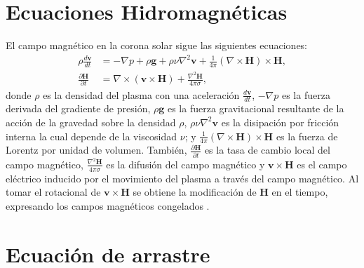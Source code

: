 \chapter{Ecuaciones Hidromagnéticas}
\label{ecuHM}

El campo magnético en la corona solar sigue las siguientes ecuaciones:
\begin{align*}
\rho \frac{d\mathbf{v}}{dt} &= -\nabla p + \rho \mathbf{g} + \rho\nu \nabla^2\mathbf{v} + \frac{1}{4\pi}(\nabla \times \mathbf{H}) \times \mathbf{H},
\\
\frac{\partial \mathbf{H}}{\partial t} &= \nabla \times (\mathbf{v} \times \mathbf{H}) + \frac{\nabla^2 \mathbf{H}}{4\pi\sigma},
\end{align*}
donde $\rho$ es la densidad del plasma con una aceleración $\frac{d\mathbf{v}}{dt}$, $-\nabla p$ es la fuerza derivada del gradiente de presión, $\rho \mathbf{g}$ es la fuerza gravitacional resultante de la acción de la gravedad sobre la densidad $\rho$, $\rho\nu \nabla^2\mathbf{v}$ es la disipación por fricción interna la cual depende de la viscosidad $\nu$; y $\frac{1}{4\pi}(\nabla \times \mathbf{H}) \times \mathbf{H}$ es la fuerza de Lorentz por unidad de volumen. También, $\frac{\partial \mathbf{H}}{\partial t}$ es la tasa de cambio local del campo magnético, $\frac{\nabla^2 \mathbf{H}}{4\pi\sigma}$ es la difusión del campo magnético y $\mathbf{v} \times \mathbf{H}$ es el campo eléctrico inducido por el movimiento del plasma a través del campo magnético. Al tomar el rotacional de $\mathbf{v} \times \mathbf{H}$ se obtiene la modificación de $\mathbf{H}$ en el tiempo, expresando los campos magnéticos congelados \parencite[e.g.,][]{billings-1966}.



\chapter{Ecuación de arrastre}
\label{apendicearrastre}


